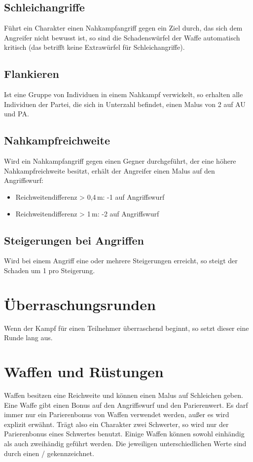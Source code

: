 \documentclass[../../Heldenanleitung2]{subfiles}
\begin{document}
\subsection{Schleichangriffe}
Führt ein Charakter einen Nahkampfangriff gegen ein Ziel durch, das sich dem Angreifer nicht bewusst ist, so sind die Schadenswürfel der Waffe automatisch kritisch (das betrifft keine Extrawürfel für Schleichangriffe).

\subsection{Flankieren}
Ist eine Gruppe von Individuen in einem Nahkampf verwickelt, so erhalten alle Individuen der Partei, die sich in Unterzahl befindet, einen Malus von 2 auf AU und PA.

\subsection{Nahkampfreichweite}
Wird ein Nahkampfangriff gegen einen Gegner durchgeführt, der eine höhere Nahkampfreichweite besitzt, erhält der Angreifer einen Malus auf den Angriffswurf:
\begin{itemize}
	\item Reichweitendifferenz > 0,4\,m: -1 auf Angriffswurf
	\item Reichweitendifferenz > 1\,m: -2 auf Angriffswurf
\end{itemize}

\subsection{Steigerungen bei Angriffen}
Wird bei einem Angriff eine oder mehrere Steigerungen erreicht, so steigt der Schaden um 1 pro Steigerung.

\section{Überraschungsrunden}
Wenn der Kampf für einen Teilnehmer überraschend beginnt, so setzt dieser eine Runde lang aus.

\section{Waffen und Rüstungen}
Waffen besitzen eine Reichweite und können einen Malus auf Schleichen geben. Eine Waffe gibt einen Bonus auf den Angriffswurf und den Parierenwert. Es darf immer nur ein Parierenbonus von Waffen verwendet werden, außer es wird explizit erwähnt. Trägt also ein Charakter zwei Schwerter, so wird nur der Parierenbonus eines Schwertes benutzt. Einige Waffen können sowohl einhändig als auch zweihändig geführt werden. Die jeweiligen unterschiedlichen Werte sind durch einen / gekennzeichnet.
\end{document}
